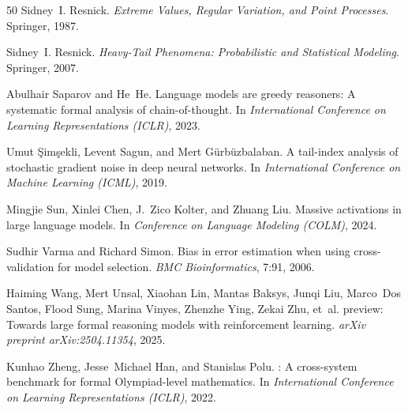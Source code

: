 \begin{thebibliography}{50}
Sidney~I. Resnick.
\newblock \emph{Extreme Values, Regular Variation, and Point Processes}.
\newblock Springer, 1987.

Sidney~I. Resnick.
\newblock \emph{Heavy-Tail Phenomena: Probabilistic and Statistical Modeling}.
\newblock Springer, 2007.

Abulhair Saparov and He~He.
\newblock Language models are greedy reasoners: A systematic formal analysis of chain-of-thought.
\newblock In \emph{International Conference on Learning Representations (ICLR)}, 2023.

Umut {\c{S}}im{\c{s}}ekli, Levent Sagun, and Mert G{\"u}rb{\"u}zbalaban.
\newblock A tail-index analysis of stochastic gradient noise in deep neural networks.
\newblock In \emph{International Conference on Machine Learning (ICML)}, 2019.

Mingjie Sun, Xinlei Chen, J.~Zico Kolter, and Zhuang Liu.
\newblock Massive activations in large language models.
\newblock In \emph{Conference on Language Modeling (COLM)}, 2024.

Sudhir Varma and Richard Simon.
\newblock Bias in error estimation when using cross-validation for model selection.
\newblock \emph{BMC Bioinformatics}, 7:91, 2006.

Haiming Wang, Mert Unsal, Xiaohan Lin, Mantas Baksys, Junqi Liu, Marco~Dos Santos, Flood Sung, Marina Vinyes, Zhenzhe Ying, Zekai Zhu, et~al.
 preview: Towards large formal reasoning models with reinforcement learning.
\newblock \emph{arXiv preprint arXiv:2504.11354}, 2025.

Kunhao Zheng, Jesse~Michael Han, and Stanislas Polu.
: A cross-system benchmark for formal {Olympiad}-level mathematics.
\newblock In \emph{International Conference on Learning Representations (ICLR)}, 2022.

\end{thebibliography}
